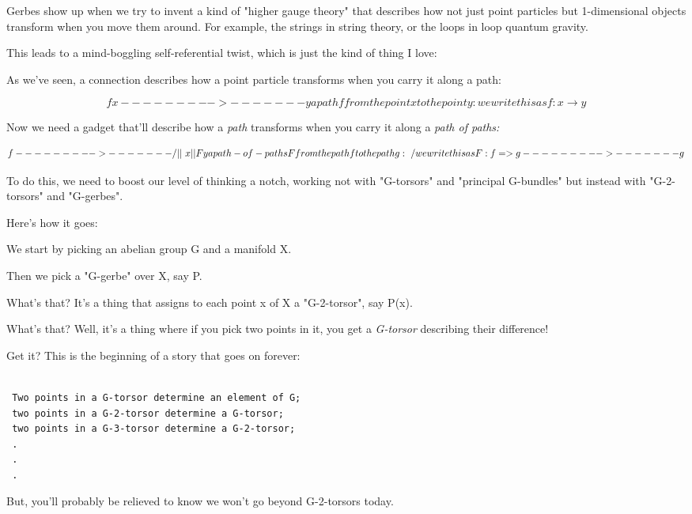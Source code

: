Gerbes show up when we try to invent a kind of "higher gauge theory" 
that describes how not just point particles but 1-dimensional objects
transform when you move them around.  For example, the strings in string 
theory, or the loops in loop quantum gravity.  

This leads to a mind-boggling self-referential twist, which is just the
kind of thing I love:

As we've seen, a connection describes how a point particle transforms when 
you carry it along a path:


$$

            f
  x--------->-------y     a path f from the point x to the point y:
                                  we write this as f: x \to  y
$$
    
Now we need a gadget that'll describe how a \emph{path} transforms when you 
carry it along a \emph{path of paths:}


$$

             f
    --------->-------
   /        ||       \
  x         ||F       y   a path-of-paths F from the path f to the path g:
   \        \/       /            we write this as F: f => g
    --------->-------
               g
$$
    

To do this, we need to boost our level of thinking a notch, working
not with "G-torsors" and "principal G-bundles" but
instead with "G-2-torsors" and "G-gerbes".

Here's how it goes:

We start by picking an abelian group G and a manifold X.  

Then we pick a "G-gerbe" over X, say P.   

What's that?  It's a thing that assigns to each point x of X a
"G-2-torsor", say P(x).

What's that?  Well, it's a thing where if you pick two points in it, you 
get a \emph{G-torsor} describing their difference!   

Get it?  This is the beginning of a story that goes on forever:


\begin{verbatim}

 Two points in a G-torsor determine an element of G;
 two points in a G-2-torsor determine a G-torsor;
 two points in a G-3-torsor determine a G-2-torsor;
 .
 .
 .
\end{verbatim}
    
But, you'll probably be relieved to know we won't go beyond G-2-torsors 
today.

